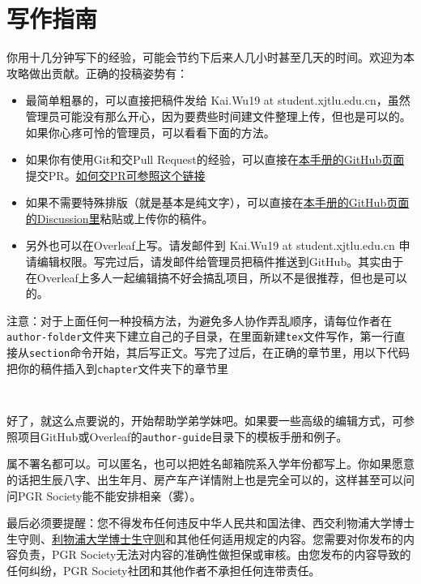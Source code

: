 \chapter{写作指南}
\label{chapter.author-ins}


你用十几分钟写下的经验，可能会节约下后来人几小时甚至几天的时间。欢迎为本攻略做出贡献。正确的投稿姿势有：

\begin{itemize}
    \item 最简单粗暴的，可以直接把稿件发给 Kai.Wu19 at student.xjtlu.edu.cn，虽然管理员可能没有那么开心，因为要费些时间建文件整理上传，但也是可以的。如果你心疼可怜的管理员，可以看看下面的方法。
    \item 如果你有使用Git和交Pull Request的经验，可以直接在\href{https://github.com/kaiwu-astro/xp_pgrs_unofficial_guide}{本手册的GitHub页面}提交PR。\href{https://www.zhihu.com/question/21682976/answer/79489643}{如何交PR可参照这个链接}
    \item 如果不需要特殊排版（就是基本是纯文字），可以直接在\href{https://github.com/kaiwu-astro/xp_pgrs_unofficial_guide/discussions}{本手册的GitHub页面的Discussion里}粘贴或上传你的稿件。
    \item 另外也可以在Overleaf上写。请发邮件到 Kai.Wu19 at student.xjtlu.edu.cn 申请编辑权限。写完过后，请发邮件给管理员把稿件推送到GitHub。其实由于在Overleaf上多人一起编辑搞不好会搞乱项目，所以不是很推荐，但也是可以的。
\end{itemize} 

\vspace{5mm}
注意：对于上面任何一种投稿方法，为避免多人协作弄乱顺序，请每位作者在\texttt{author-folder}文件夹下建立自己的子目录，在里面新建\texttt{tex}文件写作，第一行直接从\texttt{section}命令开始，其后写正文。写完了过后，在正确的章节里，用以下代码把你的稿件插入到\texttt{chapter}文件夹下的章节里
\begin{lstlisting}
    
\end{lstlisting} 

\vspace{5mm}
好了，就这么点要说的，开始帮助学弟学妹吧。如果要一些高级的编辑方式，可参照项目GitHub或Overleaf的\texttt{author-guide}目录下的模板手册和例子。

属不署名都可以。可以匿名，也可以把姓名邮箱院系入学年份都写上。你如果愿意的话把生辰八字、出生年月、房产车产详情附上也是完全可以的，这样甚至可以问问PGR Society能不能安排相亲（雾）。

最后必须要提醒：您不得发布任何违反中华人民共和国法律、西交利物浦大学博士生守则、\href{https://www.liverpool.ac.uk/aqsd/academic-codes-of-practice/pgr-code-of-practice/}{利物浦大学博士生守则}和其他任何适用规定的内容。您需要对你发布的内容负责，PGR Society无法对内容的准确性做担保或审核。由您发布的内容导致的任何纠纷，PGR Society社团和其他作者不承担任何连带责任。